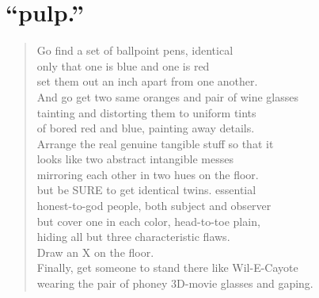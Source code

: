 \documentclass[times,12pt]{book}
\begin{document}
\section*{``pulp.''}
\begin{verse}
Go find a set of ballpoint pens, identical\\
only that one is blue and one is red\\
set them out an inch apart from one another.\\
And go get two same oranges and pair of wine glasses\\
tainting and distorting them to uniform tints\\
of bored red and blue, painting away details.\\
Arrange the real genuine tangible stuff so that it\\
looks like two abstract intangible messes\\
mirroring each other in two hues on the floor.\\
but be SURE to get identical twins. essential\\
honest-to-god people, both subject and observer\\
but cover one in each color, head-to-toe plain,\\
hiding all but three characteristic flaws.\\
Draw an X on the floor.\\
Finally, get someone to stand there like Wil-E-Cayote\\
wearing the pair of phoney 3D-movie glasses and gaping.
\end{verse}
\newpage
\end{document}

